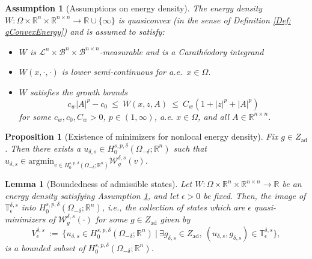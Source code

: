 \documentclass[10pt,a4paper]{amsart}
\newtheorem{assumption}{Assumption}
\newtheorem{proposition}{Proposition}
\newtheorem{lemma}{Lemma}
\def\Om{\Omega}
\def\R{\mathbb{R}}
\def\argmin{\text{argmin}}
\def\de{\delta}
\def\ep{\epsilon}
\def\ex{\exists}
\begin{document}
\begin{assumption}[Assumptions on energy density]
 \label{Assump: energyDensityAssump}
 The energy density $W: \Om \times \R^n \times \R^{n \times n} \to \R \cup \{ \infty \}$ is quasiconvex (in the sense of Definition \ref{Def: qConvexEnergy}) and is assumed to satisfy:
 \begin{itemize}
     \item $W$ is $\mathcal{L}^n \times \mathcal{B}^n \times \mathcal{B}^{n \times n}$-measurable and is a Carathéodory integrand %
\item $W (x, \cdot, \cdot)$ is lower semi-continuous for a.e.\ $x \in \Om$.
\item $W$ satisfies the growth bounds 
 \begin{equation} \label{Eq: WBound}
     c_w|A|^p - c_0 \ \leq \ W(x, z, A) \ \leq \ C_w(1 + |z|^p + |A|^p)
 \end{equation}
 for some $c_w, c_0, C_w > 0$, $p\in (1,\infty)$, a.e. $x \in \Om$, and all $A \in \R^{n \times n}$.%
 \end{itemize}
 \end{assumption}

\begin{proposition}[Existence of minimizers for nonlocal energy density]\label{Prop: QuasiConvexityEnergy}
    Fix $g \in Z_{\text{ad}}$. Then there exists a $u_{\de, s} \in H^{s, p, \de}_0(\Om_{-\de}; \R^n)$ such that $u_{\de, s} \in \argmin_{v \in H^{s, p, \de}_0(\Om_{-\de}; \R^n)}\mathcal{W}^{\de, s}_g(v)$.
\end{proposition}

    \begin{lemma}[Boundedness of admissible states]\label{Lem: boundednessAdmissibleStatesNLQuasi}
        Let $W: \Om \times \R^n \times \R^{n \times n} \rightarrow \R$ be an energy density satisfying Assumption \ref{Assump: energyDensityAssump}, and let $\ep > 0$ be fixed. Then, the image of $\mathbb{T}^{\de, s}_{\ep}$ into $H^{s, p, \de}_0(\Om_{-\de}; \R^n)$, i.e., the collection of states which are $\ep$ quasi-minimizers of $\mathcal{W}^{\de, s}_g(\cdot)$ for some $g \in Z_{\text{ad}}$ given by
	\begin{equation}\label{Eq: UNLAdmisQuasi}
		V^{\de, s}_{\ep} \ := \ \{u_{\de, s} \in H^{s, p, \de}_0(\Om_{-\de}; \R^n) \ | \ \ex g_{\de, s} \in Z_{\text{ad}}, \ (u_{\de, s}, g_{\de, s}) \in \mathbb{T}^{\de, s}_{\ep}\},
	\end{equation}
	is a bounded subset of $H^{s, p, \de}_0(\Om_{-\de}; \R^n)$. 
    \end{lemma}
\end{document}
